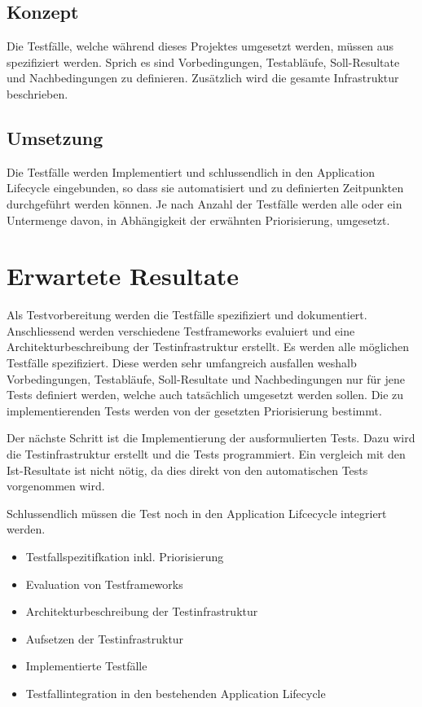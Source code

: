 \subsection{Konzept}
Die Testfälle, welche während dieses Projektes umgesetzt werden, müssen aus spezifiziert werden. Sprich es sind Vorbedingungen, Testabläufe, Soll-Resultate und Nachbedingungen zu definieren. Zusätzlich wird die gesamte Infrastruktur beschrieben.

\subsection{Umsetzung}
Die Testfälle werden Implementiert und schlussendlich in den Application Lifecycle eingebunden, so dass sie automatisiert und zu definierten Zeitpunkten durchgeführt werden können.
Je nach Anzahl der Testfälle werden alle oder ein Untermenge davon, in Abhängigkeit der erwähnten Priorisierung, umgesetzt.

\section{Erwartete Resultate}
Als Testvorbereitung werden die Testfälle spezifiziert und dokumentiert. Anschliessend werden verschiedene Testframeworks evaluiert und eine Architekturbeschreibung der Testinfrastruktur erstellt.
Es werden alle möglichen Testfälle spezifiziert. Diese werden sehr umfangreich ausfallen weshalb Vorbedingungen, Testabläufe, Soll-Resultate und Nachbedingungen nur für jene Tests definiert werden, welche auch tatsächlich umgesetzt werden sollen. Die zu implementierenden Tests werden von der gesetzten Priorisierung bestimmt.

Der nächste Schritt ist die Implementierung der ausformulierten Tests. Dazu wird die Testinfrastruktur erstellt und die Tests programmiert. Ein vergleich mit den Ist-Resultate ist nicht nötig, da dies direkt von den automatischen Tests vorgenommen wird.

Schlussendlich müssen die Test noch in den Application Lifcecycle integriert werden.

\begin{itemize}
\item Testfallspezitifkation inkl. Priorisierung
\item Evaluation von Testframeworks
\item Architekturbeschreibung der Testinfrastruktur
\item Aufsetzen der Testinfrastruktur
\item Implementierte Testfälle
\item Testfallintegration in den bestehenden Application Lifecycle
\end{itemize}